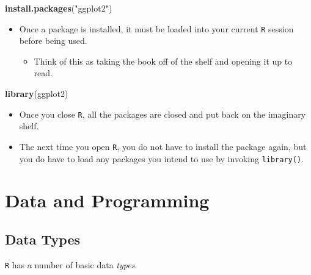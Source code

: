 \documentclass[]{book}
\newenvironment{Shaded}{\begin{snugshade}}{\end{snugshade}}
\newcommand{\KeywordTok}[1]{\textcolor[rgb]{0.13,0.29,0.53}{\textbf{#1}}}
\newcommand{\StringTok}[1]{\textcolor[rgb]{0.31,0.60,0.02}{#1}}
\newcommand{\NormalTok}[1]{#1}
\providecommand{\tightlist}{%
  \setlength{\itemsep}{0pt}\setlength{\parskip}{0pt}}
\begin{document}
\begin{Shaded}
\begin{Highlighting}[]
\KeywordTok{install.packages}\NormalTok{(}\StringTok{"ggplot2"}\NormalTok{)}
\end{Highlighting}
\end{Shaded}

\begin{itemize}
\tightlist
\item
  Once a package is installed, it must be loaded into your current
  \texttt{R} session before being used.

  \begin{itemize}
  \tightlist
  \item
    Think of this as taking the book off of the shelf and opening it up
    to read.
  \end{itemize}
\end{itemize}

\begin{Shaded}
\begin{Highlighting}[]
\KeywordTok{library}\NormalTok{(ggplot2)}
\end{Highlighting}
\end{Shaded}

\begin{itemize}
\tightlist
\item
  Once you close \texttt{R}, all the packages are closed and put back on
  the imaginary shelf.
\item
  The next time you open \texttt{R}, you do not have to install the
  package again, but you do have to load any packages you intend to use
  by invoking \texttt{library()}.
\end{itemize}

\chapter{Data and Programming}\label{data-and-programming}

\section{Data Types}\label{data-types}

\texttt{R} has a number of basic data \emph{types}.
\end{document}
